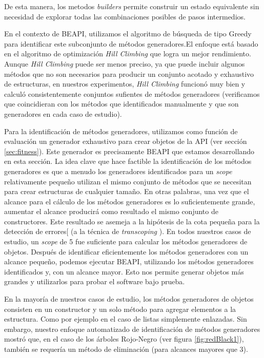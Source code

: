 De esta manera, los metodos \textit{builders} permite construir un estado equivalente sin necesidad de explorar todas las combinaciones posibles de pasos intermedios.

En el contexto de \textsf{BEAPI}, utilizamos el algoritmo de búsqueda de tipo Greedy para identificar este subconjunto de métodos generadores.El enfoque está basado en el algoritmo de optimización \emph{Hill Climbing} que logra un mejor rendimiento. Aunque \emph{Hill Climbing} puede ser menos preciso, ya que puede incluir algunos métodos que no son necesarios para producir un conjunto acotado y exhaustivo de estructuras, en nuestros experimentos, \emph{Hill Climbing}  funcionó muy bien y calculó consistentemente conjuntos sufientes de métodos generadores (verificamos que coincidieran con los métodos que identificados manualmente y que son generadores en cada caso de estudio). 

Para la identificación de métodos generadores, utilizamos como función de evaluación un generador exhaustivo para crear objetos de la API (ver sección \ref{sec:fitness}). Este generador es precisamente BEAPI que estamos desarrollando en esta sección. 
La idea clave que hace factible la identificación de los métodos generadores es que a menudo los generadores identificados para un \emph{scope} relativamente pequeño utilizan el mismo conjunto de métodos que se necesitan para crear estructuras de cualquier tamaño. En otras palabras, una vez que el alcance para el cálculo de los métodos generadores es lo suficientemente grande, aumentar el alcance producirá como resultado el mismo conjunto de constructores. Este resultado se asemeja a la hipótesis de la cota pequeña para la detección de errores[\cite{Andoni02} (a la técnica de \emph{transcoping} \cite{Rosner13}).
En todos nuestros casos de estudio, un \emph{scope} de 5 fue suficiente para calcular los métodos generadores de objetos. 
Después de identificar eficientemente los métodos generadores con un alcance pequeño, podemos ejecutar \textsf{BEAPI}, utilizando los métodos generadores identificados y, con un alcance mayor. Esto nos permite generar objetos más grandes y utilizarlos para probar el software bajo prueba.

En la mayoría de nuestros casos de estudio, los métodos generadores de objetos consisten en un constructor y un solo método para agregar elementos a la estructura. Como por ejemplo en el caso de listas simplemente enlazadas. 
Sin embargo, nuestro enfoque automatizado de identificación de métodos generadores mostró que, en el caso de los árboles Rojo-Negro (ver figura \ref{fig:redBlack1}), también se requería un método de eliminación (para alcances mayores que 3). 

